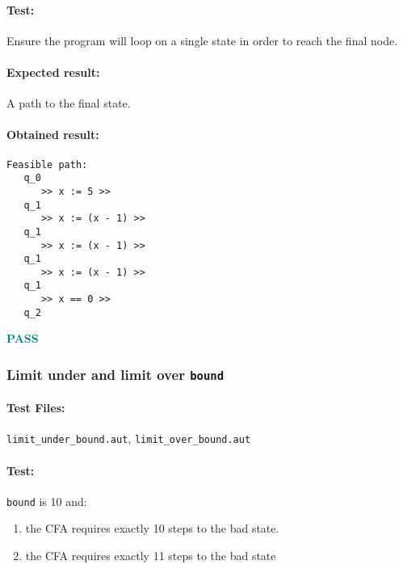 \documentclass[letterpaper,12pt]{article}
\begin{document}
\paragraph{Test:}
Ensure the program will loop on a single state in order to reach the final node.
\paragraph{Expected result:}
A path to the final state.
\paragraph{Obtained result:}
\begin{verbatim}
Feasible path:
   q_0
      >> x := 5 >>
   q_1
      >> x := (x - 1) >>
   q_1
      >> x := (x - 1) >>
   q_1
      >> x := (x - 1) >>
   q_1
      >> x == 0 >>
   q_2

\end{verbatim}
\textbf{\textcolor{teal}{PASS}}


\subsubsection{Limit under and limit over \texttt{bound}}
  
\paragraph{Test Files:} \texttt{limit\_under\_bound.aut}, \texttt{limit\_over\_bound.aut}
 
\paragraph{Test:}
\texttt{bound} is 10 and:
\begin{enumerate}
\item the CFA requires exactly 10 steps to the bad state.
\item the CFA requires exactly 11 steps to the bad state
\end{enumerate}
\end{document}
